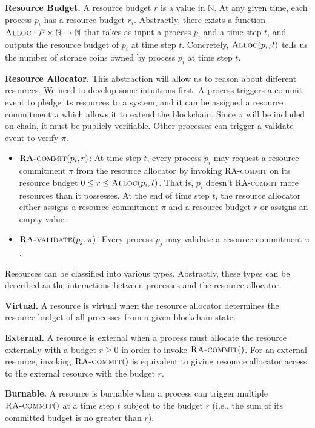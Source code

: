 \documentclass[12pt,draftcls,onecolumn]{IEEEtran}
\newcommand{\Alloc}{\textsc{Alloc}}
\begin{document}
{\bf Resource Budget.} A resource budget $r$ is a value in $\mathbb{N}$. At any given time, each process $p_i$ has a resource budget $r_i$.
Abstractly, there exists a function $\Alloc: \mathcal{P} \times \mathbb{N} \to \mathbb{N}$ that takes as input a process $p_i$
and a time step $t$, and outputs the resource budget of $p_i$ at time step $t$. Concretely, $\Alloc(p_i, t)$ tells us the number of storage coins
owned by process $p_i$ at time step $t$.

{\bf Resource Allocator.} This abstraction will allow us to reason about different resources. We need to develop some intuitions first. 
A process triggers a commit event to pledge its resources to a system, and it can be assigned a resource commitment $\pi$ which allows it to extend the blockchain. Since $\pi$ will be included on-chain, it must be publicly verifiable. Other processes can trigger a validate event to verify $\pi$.

\begin{itemize}
    \item $\textsc{RA-commit}(p_i, r)$: At time step $t$, every process $p_i$ may request a resource commitment $\pi$ from the resource allocator
    by invoking \textsc{RA-commit} on its resource budget $0 \le r \le \Alloc(p_i, t)$. That is, $p_i$ doesn't \textsc{RA-commit} more resources than it possesses. At the end of time step $t$, the resource allocator either assigns a resource commitment $\pi$ and a resource budget $r$ or assigns an empty value.

    \item $\textsc{RA-validate}(p_j, \pi)$: Every process $p_j$ may validate a resource commitment $\pi$.
\end{itemize}

Resources can be classified into various types. Abstractly, these types can be described as the interactions between processes and the resource allocator.

{\bf Virtual.} A resource is virtual when the resource allocator determines the resource budget of all processes from a given blockchain state.

{\bf External.} A resource is external when a process must allocate the resource externally with a budget $r \ge 0$ in order to invoke $\textsc{RA-commit}()$.
For an external resource, invoking $\textsc{RA-commit}()$ is equivalent to giving resource allocator access to the external resource with the budget $r$.

{\bf Burnable.} A resource is burnable when a process can trigger multiple $\textsc{RA-commit}()$ at a time step $t$ subject to the budget $r$ (i.e., the sum of its committed budget is no greater than $r$).
\end{document}
